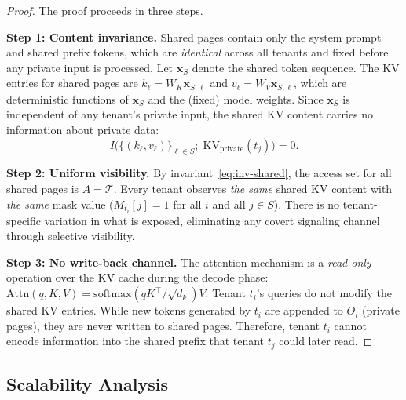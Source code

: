 \begin{proof}
The proof proceeds in three steps.

\medskip
\noindent\textbf{Step 1: Content invariance.}
Shared pages contain only the system prompt and shared prefix tokens, which are
\emph{identical} across all tenants and fixed before any private input is processed.
Let $\mathbf{x}_S$ denote the shared token sequence. The KV entries for shared pages are
$k_\ell = W_K \mathbf{x}_{S,\ell}$ and $v_\ell = W_V \mathbf{x}_{S,\ell}$, which are
deterministic functions of $\mathbf{x}_S$ and the (fixed) model weights. Since
$\mathbf{x}_S$ is independent of any tenant's private input, the shared KV content carries
no information about private data:
\begin{equation}
    I\!\big(\{(k_\ell, v_\ell)\}_{\ell \in S};\; \mathrm{KV}_{\mathrm{private}}(t_j)\big) = 0.
\end{equation}

\medskip
\noindent\textbf{Step 2: Uniform visibility.}
By invariant~\eqref{eq:inv-shared}, the access set for all shared pages is
$A = \mathcal{T}$. Every tenant observes \emph{the same} shared KV content with
\emph{the same} mask value ($M_{t_i}[j] = 1$ for all $i$ and all $j \in S$). There is no
tenant-specific variation in what is exposed, eliminating any covert signaling channel
through selective visibility.

\medskip
\noindent\textbf{Step 3: No write-back channel.}
The attention mechanism is a \emph{read-only} operation over the KV cache during the
decode phase: $\mathrm{Attn}(q, K, V) = \mathrm{softmax}(qK^\top/\sqrt{d_k})V$.
Tenant $t_i$'s queries do not modify the shared KV entries. While new tokens generated by
$t_i$ are appended to $O_i$ (private pages), they are never written to shared pages.
Therefore, tenant $t_i$ cannot encode information into the shared prefix that tenant $t_j$
could later read.
\end{proof}

\subsection{Scalability Analysis}
\label{sec:formal:scalability}


